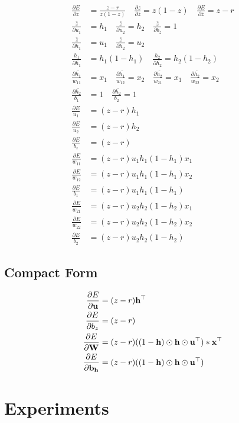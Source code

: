 \documentclass[12pt]{amsart}
\begin{document}
\begin{align*}
\frac{\partial E}{\partial z} &= \frac{z-r}{z(1-z)} \quad 
\frac{\partial z}{\partial \bar{z}} = z(1-z) \quad
\frac{\partial E}{\partial \bar{z}} = z-r \\
\frac{\bar{z} }{\partial u_1} &= h_1 \quad
\frac{\bar{z} }{\partial u_2} = h_2  \quad
\frac{\bar{z} }{\partial b_z} = 1 \\
\frac{\bar{z} }{\partial h_1} &= u_1  \quad
\frac{\bar{z} }{\partial h_2} = u_2  \\
\frac{h_1 }{\partial \bar{h_1}} &= h_1(1-h_1)  \quad
\frac{h_2 }{\partial \bar{h_2}} = h_2(1-h_2)  \\
\frac{\partial \bar{h_1}}{w_{11}} &= x_1  \quad
\frac{\partial \bar{h_1}}{w_{12}} = x_2  \quad
\frac{\partial \bar{h_2}}{w_{21}} = x_1  \quad
\frac{\partial \bar{h_2}}{w_{22}} = x_2  \\
\frac{\partial \bar{h_2}}{b_1} &= 1  \quad
\frac{\partial \bar{h_2}}{b_2} = 1  \\
\frac{\partial E}{u_1} &= (z-r) h_1 \\
\frac{\partial E}{u_2} &=  (z-r) h_2 \\
\frac{\partial E}{b_z} &=  (z-r) \\
\frac{\partial E}{w_{11}} &=  (z-r) u_1 h_1(1-h_1) x_1 \\
\frac{\partial E}{w_{12}} &=  (z-r) u_1 h_1(1-h_1)x_2 \\ 
\frac{\partial E}{b_1} &=  (z-r) u_1 h_1(1-h_1) \\
\frac{\partial E}{w_{21}} &=  (z-r)  u_2 h_2(1-h_2) x_1 \\
\frac{\partial E}{w_{22}} &=  (z-r) u_2 h_2(1-h_2) x_2 \\
\frac{\partial E}{b_2} &=  (z-r) u_2 h_2(1-h_2) 
\end{align*}
\subsection{Compact Form}
\begin{align*}
\frac{\partial E}{\partial \bold{u}} &= (z-r) \bold{h^{\top}} \\
\frac{\partial E}{\partial b_z} &= (z-r)  \\
\frac{\partial E}{\partial \bold{W}} &= (z-r) ( (1-\bold{h}) \odot \bold{h} \odot \bold{u^{\top}} )  * \bold{x^{\top}}  \\
\frac{\partial E}{\partial \bold{b_h}} &= (z-r) ( (1-\bold{h}) \odot \bold{h} \odot \bold{u^{\top}} ) 
\end{align*}
\section{Experiments}
\end{document}
